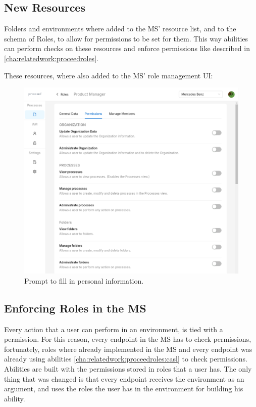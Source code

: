\subsection{New Resources}

Folders and environments where added to the MS' resource list, and to the schema of
Roles, to allow for permissions to be set for them.
This way abilities can perform checks on these resources and enforce permissions like
described in \ref{cha:relatedwork:proceedroles}.

These resources, where also added to the MS' role management UI:

\begin{figure}[H]
	\centering
	\includegraphics[scale=0.2]{images/role-permissions-view.png}
	\caption{Prompt to fill in personal information.}
	\vspace{-1em} %
	\label{fig:prompt-fill-personal-information}
\end{figure}



\subsection{Enforcing Roles in the MS}

Every action that a user can perform in an environment, is tied with a permission.
For this reason, every endpoint in the MS has to check permissions, fortunately, roles
where already implemented in the MS and every endpoint was already using abilities
\ref{cha:relatedwork:proceedroles:casl} to check permissions.
Abilities are built with the permissions stored in roles that a user has.
The only thing that was changed is that every endpoint receives the environment as an
argument, and uses the roles the user has in the environment for building his ability.

